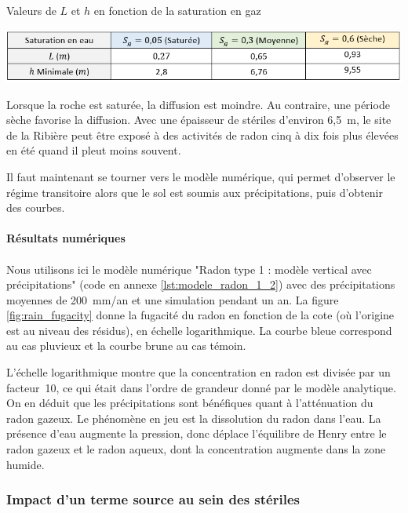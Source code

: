 \documentclass{article}
\begin{document}
\begin{table}[H]
    \centering
    \caption{Valeurs de $L$ et $h$ en fonction de la saturation en gaz}
    \includegraphics[width = \linewidth]{III_C_4.png}

    \label{tab:tableau_saturation}
\end{table}

Lorsque la roche est saturée, la diffusion est moindre. Au contraire, une période sèche favorise la diffusion. Avec une épaisseur de stériles d'environ 6,5~m, le site de la Ribière peut être exposé à des activités de radon cinq à dix fois plus élevées en été quand il pleut moins souvent.

Il faut maintenant se tourner vers le modèle numérique, qui permet d’observer le régime transitoire alors que le sol est soumis aux précipitations, puis d'obtenir des courbes.

\paragraph{Résultats numériques}

\paragraph{} Nous utilisons ici le modèle numérique "Radon type 1 : modèle vertical avec précipitations" (code en annexe \ref{lst:modele_radon_1_2}) avec des précipitations moyennes de 200~mm/an et une simulation pendant un an. La figure \ref{fig:rain_fugacity} donne la fugacité du radon en fonction de la cote (où l'origine est au niveau des résidus), en échelle logarithmique. La courbe bleue correspond au cas pluvieux et la courbe brune au cas témoin.

L’échelle logarithmique montre que la concentration en radon est divisée par un facteur~10, ce qui était dans l'ordre de grandeur donné par le modèle analytique. On en déduit que les précipitations sont bénéfiques quant à l’atténuation du radon gazeux. Le phénomène en jeu est la dissolution du radon dans l’eau. La présence d’eau augmente la pression, donc déplace l’équilibre de Henry entre le radon gazeux et le radon aqueux, dont la concentration augmente dans la zone humide.


\subsubsection{Impact d'un terme source au sein des stériles}
\end{document}
